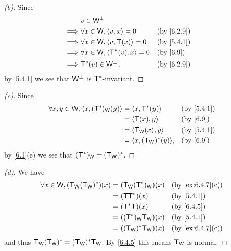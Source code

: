 \begin{proof}[(b)]
  Since
  \begin{align*}
             & v \in \W^{\perp}                                                     \\
    \implies & \forall x \in \W, \inn{v, x} = 0       &  & \text{(by \cref{6.2.9})} \\
    \implies & \forall x \in \W, \inn{v, \T(x)} = 0   &  & \text{(by \cref{5.4.1})} \\
    \implies & \forall x \in \W, \inn{\T^*(v), x} = 0 &  & \text{(by \cref{6.9})}   \\
    \implies & \T^*(v) \in \W^{\perp},                &  & \text{(by \cref{6.2.9})}
  \end{align*}
  by \cref{5.4.1} we see that \(\mathsf{W}^{\perp}\) is \(\mathsf{T}^*\)-invariant.
\end{proof}

\begin{proof}[(c)]
  Since
  \begin{align*}
    \forall x, y \in \W, \inn{x, (\T^*)_{\W}(y)} & = \inn{x, \T^*(y)}         &  & \text{(by \cref{5.4.1})} \\
                                                 & = \inn{\T(x), y}           &  & \text{(by \cref{6.9})}   \\
                                                 & = \inn{\T_{\W}(x), y}      &  & \text{(by \cref{5.4.1})} \\
                                                 & = \inn{x, (\T_{\W})^*(y)}, &  & \text{(by \cref{6.9})}
  \end{align*}
  by \cref{6.1}(e) we see that \((\mathsf{T}^*)_{\mathsf{W}} = (\mathsf{T}_{\mathsf{W}})^*\).
\end{proof}

\begin{proof}[(d)]
  We have
  \begin{align*}
    \forall x \in \W, (\T_{\W} (\T_{\W})^*)(x) & = (\T_{\W} (\T^*)_{\W})(x) &  & \text{(by \cref{ex:6.4.7}(c))} \\
                                               & = (\T \T^*)(x)             &  & \text{(by \cref{5.4.1})}       \\
                                               & = (\T^* \T)(x)             &  & \text{(by \cref{6.4.5})}       \\
                                               & = ((\T^*)_{\W} \T_{\W})(x) &  & \text{(by \cref{5.4.1})}       \\
                                               & = ((\T_{\W})^* \T_{\W})(x) &  & \text{(by \cref{ex:6.4.7}(c))}
  \end{align*}
  and thus \(\mathsf{T}_{\mathsf{W}} (\mathsf{T}_{\mathsf{W}})^* = (\mathsf{T}_{\mathsf{W}})^* \mathsf{T}_{\mathsf{W}}\).
  By \cref{6.4.5} this means \(\mathsf{T}_{\mathsf{W}}\) is normal.
\end{proof}

